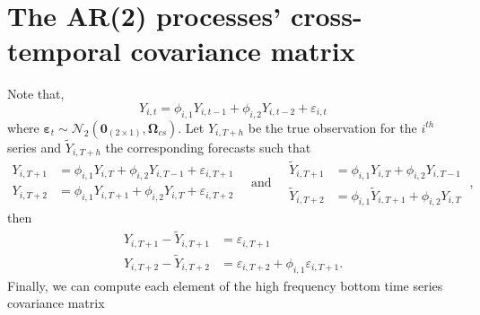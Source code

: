 \documentclass[a4paper,11pt]{article}
\newcommand{\epsvet}{\bm{\varepsilon}}
\newcommand{\Zerovet}{\bm{0}}
\newcommand{\Omegavet}{\bm{\Omega}}
\theoremstyle{definition}
\begin{document}
\section{\large The AR(2) processes' cross-temporal covariance matrix}\label{app:ar2}

Note that,
$$
	Y_{i,t} = \phi_{i,1}Y_{i,t-1} + \phi_{i,2}Y_{i,t-2} + \varepsilon_{i,t}
$$
where $\epsvet_t \sim \mathcal{N}_{2}\left(\Zerovet_{(2\times 1)}, \Omegavet_{cs}\right)$. Let $Y_{i,T+h}$ be the true observation for the $i^{th}$ series and $\widetilde{Y}_{i,T+h}$ the corresponding forecasts such that
$$
	\begin{array}{rl}
		Y_{i,T+1} & = \phi_{i,1}Y_{i,T} + \phi_{i,2}Y_{i,T-1} + \varepsilon_{i,T+1} \\
		Y_{i,T+2} & = \phi_{i,1}Y_{i,T+1} + \phi_{i,2}Y_{i,T} + \varepsilon_{i,T+2}
	\end{array}
	\quad\text{and}\quad
	\begin{array}{rl}
		\widetilde{Y}_{i,T+1} & = \phi_{i,1}Y_{i,T} + \phi_{i,2}Y_{i,T-1}             \\
		\widetilde{Y}_{i,T+2} & = \phi_{i,1}\widetilde{Y}_{i,T+1} + \phi_{i,2}Y_{i,T}
	\end{array}\;,
$$
then
\begin{align*}
	Y_{i,T+1} - \widetilde{Y}_{i,T+1} & = \varepsilon_{i,T+1}                                   \\
	Y_{i,T+2} - \widetilde{Y}_{i,T+2} & = \varepsilon_{i,T+2} + \phi_{i,1} \varepsilon_{i,T+1}.
\end{align*}
Finally, we can compute each element of the high frequency bottom time series covariance matrix
\end{document}
